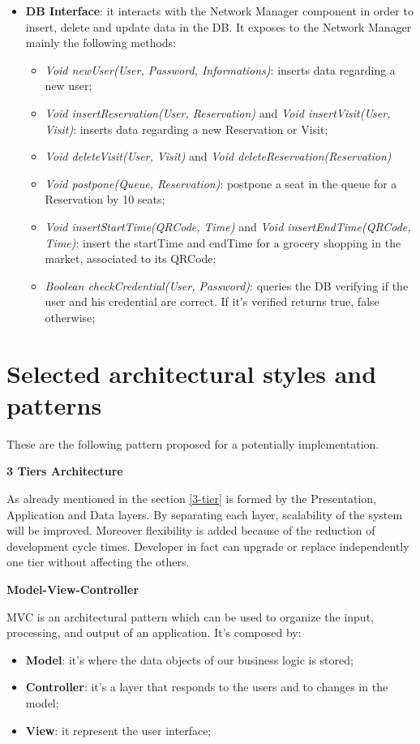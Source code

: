 \begin{itemize}
\item \textbf{DB Interface}: it interacts with the Network Manager component in order to insert, delete and update data in the DB. It exposes to the Network Manager mainly the following methods:
\begin{itemize}
\item \textit{Void newUser(User, Password, Informations)}: inserts data regarding a new user;
\item \textit{Void insertReservation(User, Reservation)} and \textit{Void insertVisit(User, Visit)}: inserts data regarding a new Reservation or Visit;
\item \textit{Void deleteVisit(User, Visit)} and \textit{Void deleteReservation(Reservation)}
\item \textit{Void postpone(Queue, Reservation)}: postpone a seat in the queue for a Reservation by 10 seats;
\item \textit{Void insertStartTime(QRCode, Time)} and  \textit{Void insertEndTime(QRCode, Time)}: insert the startTime and endTime for a grocery shopping in the market, associated to its QRCode;
\item \textit{Boolean checkCredential(User, Password)}: queries the DB verifying if the user and his credential are correct. If it's verified returns true, false otherwise;
\end{itemize}

\end{itemize}

\pagebreak
\section{Selected architectural styles and patterns}
These are the following pattern proposed for a potentially implementation.
\medskip

\textbf{3 Tiers Architecture} \par
As already mentioned in the section \ref{3-tier} is formed by the Presentation, Application and Data layers. By separating each layer, scalability of the system will be improved.
Moreover flexibility is added because of the reduction of development cycle times. Developer in fact can upgrade or replace independently one tier without affecting the others. 
\bigskip

\textbf{Model-View-Controller} \par
MVC is an architectural pattern which can be used to organize the input, processing, and output of an application. It's composed by:
\begin{itemize}
\item \textbf{Model}: it's where the data objects of our business logic is stored;
\item \textbf{Controller}: it's a layer that responds to the users and to changes in the model;
\item \textbf{View}: it represent the user interface;
\end{itemize}


